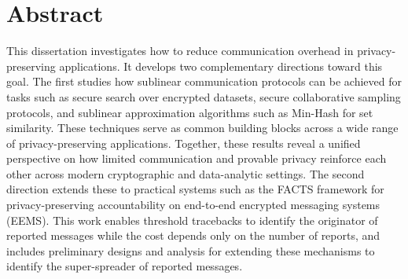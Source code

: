 \section*{Abstract}
This dissertation investigates how to reduce communication overhead in privacy-preserving applications. It develops two complementary directions toward this goal. The first studies how sublinear communication protocols can be achieved for tasks such as secure search over encrypted datasets, secure collaborative sampling protocols, and sublinear approximation algorithms such as Min-Hash for set similarity. These techniques serve as common building blocks across a wide range of privacy-preserving applications. Together, these results reveal a unified perspective on how limited communication and provable privacy reinforce each other across modern cryptographic and data-analytic settings. 
The second direction extends these to practical systems such as the FACTS framework for privacy-preserving accountability on end-to-end encrypted messaging systems (EEMS). This work enables threshold tracebacks to identify the originator of reported messages while the cost depends only on the number of reports, and includes preliminary designs and analysis for extending these mechanisms to identify the super-spreader of reported messages.

